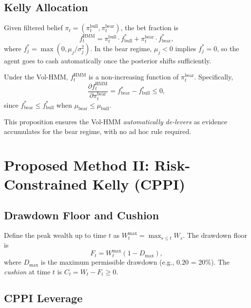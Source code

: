 \subsection{Kelly Allocation}

Given filtered belief $\pi_t = (\pi_t^{\text{bull}}, \pi_t^{\text{bear}})$,
the bet fraction is
\[
    f_t^{\text{HMM}} = \pi_t^{\text{bull}} \cdot f^*_{\text{bull}} +
    \pi_t^{\text{bear}} \cdot f^*_{\text{bear}},
\]
where $f^*_j = \max(0, \mu_j/\sigma_j^2)$. In the bear regime, $\mu_j < 0$
implies $f^*_j = 0$, so the agent goes to cash automatically once the
posterior shifts sufficiently.

\begin{proposition}
\label{prop:leverage}
    Under the Vol-HMM, $f_t^{\text{HMM}}$ is a non-increasing function of
    $\pi_t^{\text{bear}}$. Specifically,
    \[
        \frac{\partial f_t^{\text{HMM}}}{\partial \pi_t^{\text{bear}}} =
        f^*_{\text{bear}} - f^*_{\text{bull}} \leq 0,
    \]
    since $f^*_{\text{bear}} \leq f^*_{\text{bull}}$ when $\mu_{\text{bear}}
    \leq \mu_{\text{bull}}$.
\end{proposition}

This proposition ensures the Vol-HMM \emph{automatically de-levers} as
evidence accumulates for the bear regime, with no ad hoc rule required.

\section{Proposed Method II: Risk-Constrained Kelly (CPPI)}
\label{sec:cppi}

\subsection{Drawdown Floor and Cushion}

Define the peak wealth up to time $t$ as
$W_t^{\max} = \max_{s \leq t} W_s$. The drawdown floor is
\[
    F_t = W_t^{\max}(1 - D_{\max}),
\]
where $D_{\max}$ is the maximum permissible drawdown (e.g., $0.20$ = 20\%).
The \emph{cushion} at time $t$ is $C_t = W_t - F_t \geq 0$.

\subsection{CPPI Leverage}

